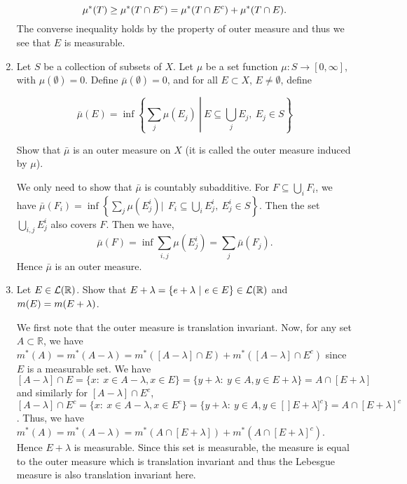 \documentclass[12pt]{article}
\newcommand{\rl}{\mathbb{R}}
\begin{document}
\begin{enumerate}
\begin{mybox}
        $$\mu^*(T)\geq \mu^*(T\cap E^c)=\mu^*(T\cap E^c)
        +\mu^*(T\cap E).$$
        The converse inequality holds by the property of
        outer measure and thus we see that $E$ is measurable.
    \end{mybox}
    \item Let $S$ be a collection of subsets of $X$. Let $\mu$ be a set function $\mu: S \to [0,\infty]$, with $\mu(\emptyset) = 0$. Define $\bar \mu(\emptyset) = 0$, and for all $E \subset X$, $ E \neq \emptyset$, define 
    
    $$\bar \mu (E)= \inf \left\{ \left.\sum_j \mu(E_j) \ \right| \ E \subseteq \bigcup_j E_j, \  E_j \in S \right\}$$
    
    Show that $\bar \mu$ is an outer measure on $X$ (it is called the outer measure induced by $\mu$). 
    \begin{mybox}
        We only need to show that $\bar\mu$ is countably subadditive.
        For $F \subseteq \bigcup_i F_i$, we have $\bar\mu(F_i)
        =\inf \left\{\sum_j \mu(E_j^i) |\ \ F_i \subseteq \bigcup_i E_j^i, \  E_j^i \in S \right\}$.
        Then the set $\bigcup_{i,j} E_j^i$ also covers
        $F$. Then we have,
        $$\bar\mu(F)=\inf\sum_{i,j}{\mu(E^i_j)}=
        \sum_j{\bar\mu(F_j)}.$$
        Hence $\bar\mu$ is an outer measure.
    \end{mybox}
    
    
    
    \item Let $E \in \mathcal{L}(\mathbb{R})$. Show that $\displaystyle E + \lambda = \{e + \lambda \ | \ e \in E\} \in \mathcal{L}(\mathbb{R})$ and $m(E) = m(E+\lambda)$.  
    
    \begin{mybox}
        We first note that the outer measure is
        translation invariant. Now, for any set $A\subset \rl$,
        we have $m^*(A)=m^*(A-\lambda)= m^*([A-\lambda]
        \cap E)+m^*([A-\lambda]\cap E^c)$ since $E$ is
        a measurable set. We have $[A-\lambda]\cap E=
        \{x:\ x\in A-\lambda, x\in E\}=
        \{y+\lambda:\ y\in A, y\in E+\lambda\}
        =A\cap [E+\lambda]$ and similarly
        for $[A-\lambda]\cap E^c$,
        $[A-\lambda]\cap E^c=
        \{x:\ x\in A-\lambda, x\in E^c\}=
        \{y+\lambda:\ y\in A, y\in[] E+\lambda]^c\}
        =A\cap [E+\lambda]^c$. Thus, we have
        $m^*(A)=m^*(A-\lambda)= m^*(A
        \cap [E+\lambda])+m^*(A\cap [E+\lambda]^c)$.
        Hence $E+\lambda$ is measurable. Since this
        set is measurable, the measure is equal to
        the outer measure which is translation invariant
        and thus the Lebesgue measure is also translation
        invariant here.
    \end{mybox}
    

\end{enumerate}
\end{document}
